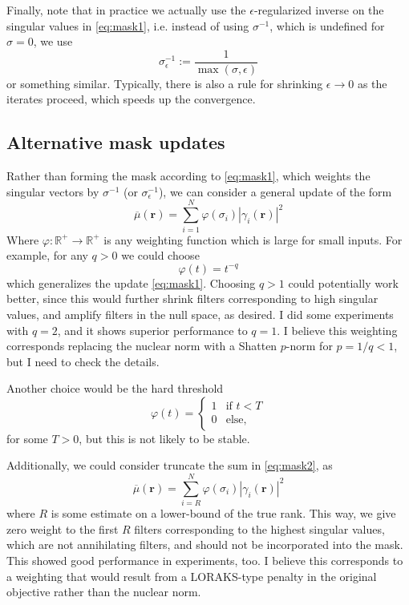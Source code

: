 \documentclass[10pt, twocolumn, twoside]{IEEEtran}
\begin{document}
Finally, note that in practice we actually use the $\epsilon$-regularized inverse on the singular values in \eqref{eq:mask1}, i.e. instead of using $\sigma^{-1}$, which is undefined for $\sigma = 0$, we use 
\[
\sigma_\epsilon^{-1} := \frac{1}{\max(\sigma,\epsilon)}
\]
or something similar. Typically, there is also a rule for shrinking $\epsilon\rightarrow 0$ as the iterates proceed, which speeds up the convergence.

\subsection{Alternative mask updates}
Rather than forming the mask according to \eqref{eq:mask1}, which weights the singular vectors by $\sigma^{-1}$ (or $\sigma_\epsilon^{-1}$), we can consider a general update of the form
\begin{equation}
\label{eq:mask2}
\overline{\mu}(\mathbf r) = \sum_{i=1}^N \varphi(\sigma_i) |\gamma_i(\mathbf r)|^2
\end{equation}
Where $\varphi:\mathbb{R}^+\rightarrow \mathbb{R}^+$ is any weighting function which is large for small inputs. For example, for any $q>0$ we could choose
\[
\varphi(t) = t^{-q} 
\]
which generalizes the update \eqref{eq:mask1}. Choosing $q > 1$ could potentially work better, since this would further shrink filters corresponding to high singular values, and amplify filters in the null space, as desired. I did some experiments with $q=2$, and it shows superior performance to $q=1$. I believe this weighting corresponds replacing the nuclear norm with a Shatten $p$-norm for $p=1/q < 1$, but I need to check the details.

Another choice would be the hard threshold
\[
\varphi(t) = \begin{cases}1 & \text{if } t < T\\ 0 & \text{else},\end{cases}
\]
for some $T > 0$, but this is not likely to be stable.

Additionally, we could consider truncate the sum in \eqref{eq:mask2}, as
\begin{equation}
\label{eq:mask3}
\overline{\mu}(\mathbf r) = \sum_{i=R}^N \varphi(\sigma_i) |\gamma_i(\mathbf r)|^2
\end{equation}
where $R$ is some estimate on a lower-bound of the true rank. This way, we give zero weight to the first $R$ filters corresponding to the highest singular values, which are not annihilating filters, and should not be incorporated into the mask. This showed good performance in experiments, too. I believe this corresponds to a weighting that would result from a LORAKS-type penalty in the original objective rather than the nuclear norm.
\end{document}
